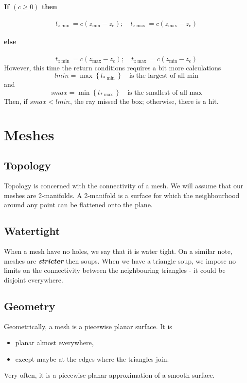 \documentclass[11pt]{article}
\begin{document}
\paragraph{If $(c \geq 0)$ then}
\begin{equation}
	t_{z\min} = c(z_{\min} - z_e); \quad t_{z\max} = c(z_{\max} - z_e)
\end{equation}
\vspace{-3em}
\paragraph{else}
\begin{equation}
	t_{z\min} = c(z_{\max} - z_e); \quad t_{z\max} = c(z_{\min} - z_e)
\end{equation}
However, this time the return conditions requires a bit more calculations
\begin{equation}
	lmin = \max\left\{ t_{\ast\min} \right\} \quad \text{is the largest of all min}
\end{equation}
and 
\begin{equation}
	smax = \min\left\{ t_{\ast\max} \right\} \quad \text{is the smallest of all max}
\end{equation}
Then, if $smax < lmin$, the ray missed the box; otherwise, there is a hit. 


\section{Meshes}
\subsection{Topology}
Topology is concerned with the connectivity of a mesh. We will assume that our meshes are 2-manifolds. A 2-manifold is a surface for which the neighbourhood around any point can be flattened onto the plane. 

\subsection{Watertight}
When a mesh have no holes, we say that it is water tight. On a similar note, meshes are \textit{\textbf{stricter}} then soups. When we have a triangle soup, we impose no limits on the connectivity between the neighbouring triangles - it could be disjoint everywhere.

\subsection{Geometry}
Geometrically, a mesh is a piecewise planar surface. It is 
\begin{itemize}
	\item planar almost everywhere, 
	\item except maybe at the edges where the triangles join. 
\end{itemize}
Very often, it is a piecewise planar approximation of a smooth surface. 
\end{document}
